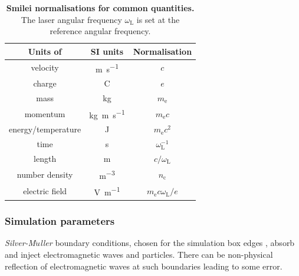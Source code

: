 \begin{table}
	\begin{center}
		\begin{tabular}{ccc}
			\hline \hline
			Units of & SI units & Normalisation \\
			\hline
			velocity & \unit{m.s^{-1}} & $c$ \\
			charge & C & $e$ \\
			mass & kg & $m_\mathrm{e}$ \\
			momentum & \unit{kg.m.s^{-1}} & $m_\mathrm{e}c$ \\
			energy/temperature & J & $m_\mathrm{e}c^2$ \\
			time & s & $\omega^{-1}_\mathrm{L}$ \\
			length & m & $c/\omega_\mathrm{L}$ \\
			number density & \unit{m^{-3}} & $n_\mathrm{c}$ \\
			electric field & \unit{V.m^{-1}} & $m_\mathrm{e}c\omega_\mathrm{L}/e$ \\
			\hline \hline
		\end{tabular}
		\caption{\label{tab:intro-normalisations} \textbf{Smilei normalisations for common quantities.} The laser angular frequency $\omega_\mathrm{L}$ is set at the reference angular frequency.}
	\end{center}
\end{table}

\subsubsection{Simulation parameters}\label{sec:intro-general_simulation_paramers}
\textit{Silver-M$\ddot{u}$ller} boundary conditions, chosen for the simulation box edges \cite{barucqAsymptoticBehaviorSolutions1997}, absorb and inject electromagnetic waves and particles. There can be non-physical reflection of electromagnetic waves at such boundaries leading to some error.

